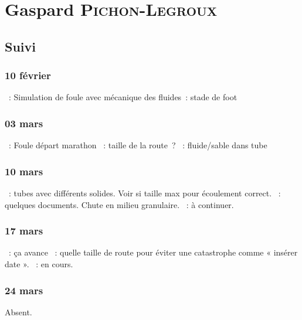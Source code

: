 \documentclass[a4paper, 11pt, final, garamond]{book}
\begin{document}
\chapter{Gaspard \textsc{Pichon-Legroux}}
\label{ch:gaspard}
\section{Suivi}
\subsection{10 février}
\begin{itemize}
    ~: Simulation de foule avec mécanique des fluides~: stade de
        foot
\end{itemize}

\subsection{03 mars}
\begin{itemize}
    ~: Foule départ marathon
    ~: taille de la route~?
    ~: fluide/sable dans tube
\end{itemize}

\subsection{10 mars}
\begin{itemize}
    ~: tubes avec différents solides. Voir si taille max pour
        écoulement correct.
    ~: quelques documents. Chute en milieu granulaire.
    ~: à continuer.
\end{itemize}

\subsection{17 mars}
\begin{itemize}
    ~: ça avance
    ~: quelle taille de route pour éviter une catastrophe comme «
        insérer date ».
    ~: en cours.
\end{itemize}

\subsection{24 mars}
\begin{center}
    Absent.
\end{center}
\end{document}
